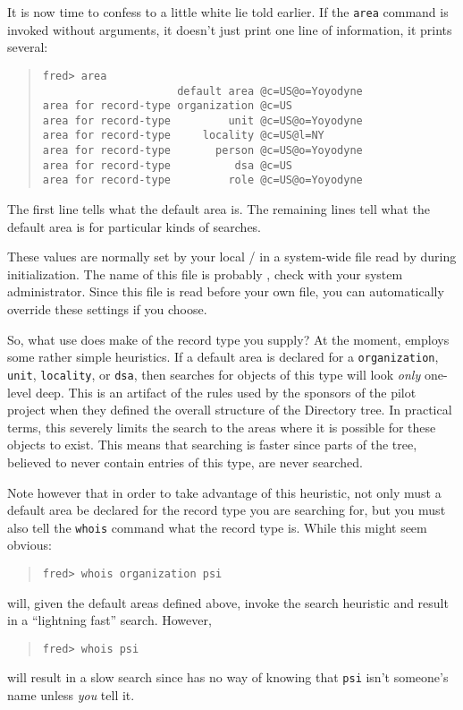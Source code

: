 It is now time to confess to a little white lie told earlier.
If the \verb"area" command is invoked without arguments,
it doesn't just print one line of information,
it prints several:
\begin{quote}\small\begin{verbatim}
fred> area
                     default area @c=US@o=Yoyodyne
area for record-type organization @c=US
area for record-type         unit @c=US@o=Yoyodyne
area for record-type     locality @c=US@l=NY
area for record-type       person @c=US@o=Yoyodyne
area for record-type          dsa @c=US
area for record-type         role @c=US@o=Yoyodyne
\end{verbatim}\end{quote}
The first line tells what the default area is.
The remaining lines tell what the default area is for particular kinds of
searches.

These values are normally set by your local \camayoc/ in a system-wide file
read by  during initialization.
The name of this file is probably ,
check with your system administrator.
Since this file is read before your own  file,
you can automatically override these settings if you choose.

So,
what use does  make of the record type you supply?
At the moment,
 employs some rather simple heuristics.
If a default area is declared for a \verb"organization",
\verb"unit", \verb"locality", or \verb"dsa",
then searches for objects of this type will look {\em only\/} one-level deep.
This is an artifact of the rules used by the sponsors of the pilot project
when they defined the overall structure of the Directory tree.
In practical terms,
this severely limits the search to the areas where it is possible for these
objects to exist.
This means that searching is faster since parts of the tree,
believed to never contain entries of this type,
are never searched.

Note however that in order to take advantage of this heuristic,
not only must a default area be declared for the record type you are searching
for,
but you must also tell the \verb"whois" command what the record type is.
While this might seem obvious:
\begin{quote}\small\begin{verbatim}
fred> whois organization psi
\end{verbatim}\end{quote}
will,
given the default areas defined above,
invoke the search heuristic and result in a ``lightning fast'' search.
However,
\begin{quote}\small\begin{verbatim}
fred> whois psi
\end{verbatim}\end{quote}
will result in a slow search since  has no way of knowing that
\verb"psi" isn't someone's name unless {\em you\/} tell it.

